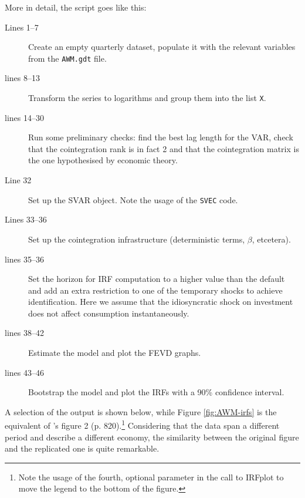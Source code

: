 \documentclass[a4paper,10pt]{article}
\newcounter{script}[section]
\begin{document}
More in detail, the script goes like this:
\begin{description}
\item[Lines 1--7] Create an empty quarterly dataset, populate it with
  the relevant variables from the \texttt{AWM.gdt} file.
\item[lines 8--13] Transform the series to logarithms and group them
  into the list \texttt{X}.
\item[lines 14--30] Run some preliminary checks: find the best lag
  length for the VAR, check that the cointegration rank is in fact 2
  and that the cointegration matrix is the one hypothesised by
  economic theory.
\item[Line 32] Set up the SVAR object. Note the usage of the
  \texttt{SVEC} code.
\item[Lines 33--36] Set up the cointegration infrastructure
  (deterministic terms, $\beta$, etcetera).
\item[lines 35--36] Set the horizon for IRF computation to a higher
  value than the default and add an extra restriction to one of the
  temporary shocks to achieve identification. Here we assume that the
  idiosyncratic shock on investment does not affect consumption
  instantaneously.
\item[lines 38--42] Estimate the model and plot the FEVD graphs.
\item[lines 43--46] Bootstrap the model and plot the IRFs with a
  90\% confidence interval.
\end{description}

A selection of the output is shown below, while Figure
\ref{fig:AWM-irfs} is the equivalent of \citeauthor{KPSW91}'s figure 2
(p. 820).\footnote{Note the usage of the fourth, optional parameter in
  the call to IRFplot to move the legend to the bottom of the figure.}
Considering that the data span a different period and describe a
different economy, the similarity between the original figure and the
replicated one is quite remarkable.
\end{document}
